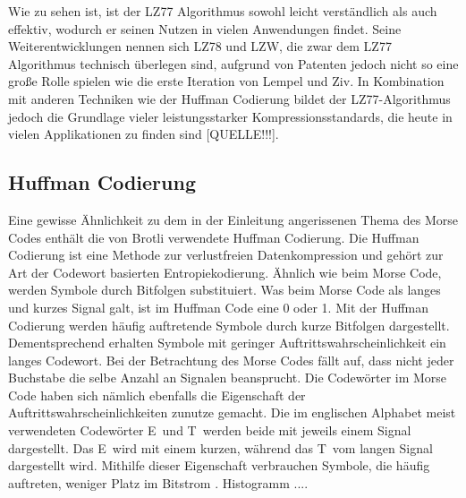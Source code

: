 Wie zu sehen ist, ist der LZ77 Algorithmus sowohl leicht verständlich als auch effektiv, wodurch er seinen Nutzen in vielen Anwendungen findet.
Seine Weiterentwicklungen nennen sich LZ78 und LZW, die zwar dem LZ77 Algorithmus technisch überlegen sind, aufgrund von Patenten jedoch nicht so eine große Rolle spielen wie die erste Iteration von Lempel und Ziv.
In Kombination mit anderen Techniken wie der Huffman Codierung bildet der LZ77-Algorithmus jedoch die Grundlage vieler leistungsstarker Kompressionsstandards, die heute in vielen Applikationen zu finden sind [QUELLE!!!]. \newline


\subsection{Huffman Codierung}
\label{subsec:huffman}
Eine gewisse Ähnlichkeit zu dem in der Einleitung angerissenen Thema des Morse Codes enthält die von Brotli verwendete Huffman Codierung.
Die Huffman Codierung ist eine Methode zur verlustfreien Datenkompression und gehört zur Art der Codewort basierten Entropiekodierung.
Ähnlich wie beim Morse Code, werden Symbole durch Bitfolgen substituiert.
Was beim Morse Code als langes und kurzes Signal galt, ist im Huffman Code eine 0 oder 1.
Mit der Huffman Codierung werden häufig auftretende Symbole durch kurze Bitfolgen dargestellt.
Dementsprechend erhalten Symbole mit geringer Auftrittswahrscheinlichkeit ein langes Codewort.
Bei der Betrachtung des Morse Codes fällt auf, dass nicht jeder Buchstabe die selbe Anzahl an Signalen beansprucht.
Die Codewörter im Morse Code haben sich nämlich ebenfalls die Eigenschaft der Auftrittswahrscheinlichkeiten zunutze gemacht.
Die im englischen Alphabet meist verwendeten Codewörter \glqq E\grqq\ und \glqq T\grqq\ werden beide mit jeweils einem Signal dargestellt.
Das \glqq E\grqq\ wird mit einem kurzen, während das \glqq T\grqq\ vom langen Signal dargestellt wird.
Mithilfe dieser Eigenschaft verbrauchen Symbole, die häufig auftreten, weniger Platz im Bitstrom \cite{Moffat2019}.
Histogramm ....

